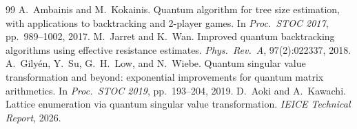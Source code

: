 \documentclass[11pt,a4paper]{article}
\begin{document}
\begin{thebibliography}{99}
 A.~Ambainis and M.~Kokainis. Quantum algorithm for tree size estimation, with applications to backtracking and 2-player games. In \emph{Proc.\ STOC 2017}, pp.\ 989--1002, 2017.
 M.~Jarret and K.~Wan. Improved quantum backtracking algorithms using effective resistance estimates. \emph{Phys.\ Rev.\ A}, 97(2):022337, 2018.
 A.~Gily\'{e}n, Y.~Su, G.~H.~Low, and N.~Wiebe. Quantum singular value transformation and beyond: exponential improvements for quantum matrix arithmetics. In \emph{Proc.\ STOC 2019}, pp.\ 193--204, 2019.
 D.~Aoki and A.~Kawachi. Lattice enumeration via quantum singular value transformation. \emph{IEICE Technical Report}, 2026.
\end{thebibliography}
\end{document}
